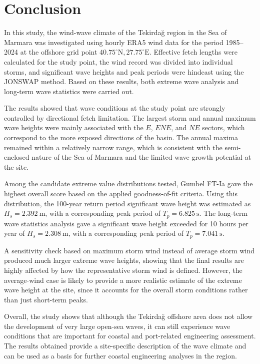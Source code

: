 \documentclass[a4paper, 11pt]{article}
\begin{document}
\section{Conclusion}

\hspace{0.5cm}In this study, the wind-wave climate of the Tekirdağ region in the Sea of Marmara was investigated using hourly ERA5 wind data for the period 1985--2024 at the offshore grid point \(40.75^\circ\mathrm{N}, 27.75^\circ\mathrm{E}\). Effective fetch lengths were calculated for the study point, the wind record was divided into individual storms, and significant wave heights and peak periods were hindcast using the JONSWAP method. Based on these results, both extreme wave analysis and long-term wave statistics were carried out.

The results showed that wave conditions at the study point are strongly controlled by directional fetch limitation. The largest storm and annual maximum wave heights were mainly associated with the \(E\), \(ENE\), and \(NE\) sectors, which correspond to the more exposed directions of the basin. The annual maxima remained within a relatively narrow range, which is consistent with the semi-enclosed nature of the Sea of Marmara and the limited wave growth potential at the site.

Among the candidate extreme value distributions tested, Gumbel FT-Ia gave the highest overall score based on the applied goodness-of-fit criteria. Using this distribution, the 100-year return period significant wave height was estimated as \(H_s = 2.392\ \mathrm{m}\), with a corresponding peak period of \(T_p = 6.825\ \mathrm{s}\). The long-term wave statistics analysis gave a significant wave height exceeded for 10 hours per year of \(H_s = 2.308\ \mathrm{m}\), with a corresponding peak period of \(T_p = 7.041\ \mathrm{s}\).

A sensitivity check based on maximum storm wind instead of average storm wind produced much larger extreme wave heights, showing that the final results are highly affected by how the representative storm wind is defined. However, the average-wind case is likely to provide a more realistic estimate of the extreme wave height at the site, since it accounts for the overall storm conditions rather than just short-term peaks.

Overall, the study shows that although the Tekirdağ offshore area does not allow the development of very large open-sea waves, it can still experience wave conditions that are important for coastal and port-related engineering assessment. The results obtained provide a site-specific description of the wave climate and can be used as a basis for further coastal engineering analyses in the region.
\newpage
\end{document}
